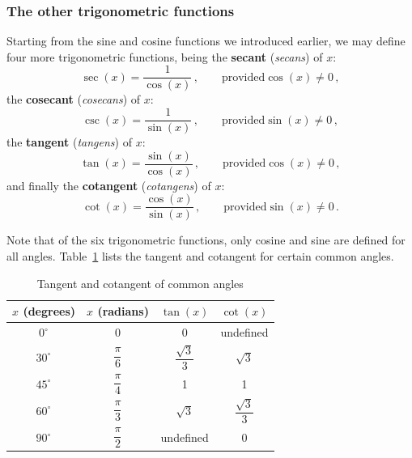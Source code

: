 \fi


\subsubsection{The other trigonometric functions}
Starting from the sine and cosine functions we introduced earlier,
we may define four more trigonometric functions, being the \textbf{secant} (\textit{secans}) of $x$:
$$\sec(x) = \dfrac{1}{\cos(x)}\,,\qquad \text{provided} \cos(x) \neq 0\,, $$
the \textbf{cosecant} (\textit{cosecans}) of $x$:
$$\csc(x) = \dfrac{1}{\sin(x)}\,,\qquad \text{provided}  \sin(x) \neq 0\,,$$
the \textbf{tangent} (\textit{tangens}) of $x$:
$$\tan(x) = \dfrac{\sin(x)}{\cos(x)}\,,\qquad \text{provided} \cos(x) \neq 0 \,,$$
  and finally  the \textbf{cotangent} (\textit{cotangens}) of $x$:
$$\cot(x) = \dfrac{\cos(x)}{\sin(x)}\,,\qquad \text{provided} \sin(x) \neq 0\,.$$


Note that of the six trigonometric functions, only cosine and sine are defined for all angles. Table~\ref{tab_trans_2} lists the tangent and cotangent for certain common angles. 

\begin{table}[H]
\caption{Tangent and cotangent of common angles}
\label{tab_trans_2}
\renewcommand{\arraystretch}{1.75}%
\begin{tabular}{cc|cc} 
 $x$ (degrees) &  $x$ (radians) & $\tan(x)$ & $\cot(x)$ \\ \hline\hline
$0^{\circ}$ & 0 & 0 & undefined \\ 
$30^{\circ}$ & $\dfrac{\pi}{6}$ & $\dfrac{\sqrt{3}}{3}$ & $\sqrt{3}$ \\ [2pt] 
$45^{\circ}$ & $\dfrac{\pi}{4}$ & 1 & 1\\ [2pt] 
$60^{\circ}$ & $\dfrac{\pi}{3}$ & $\sqrt{3}$& $\dfrac{\sqrt{3}}{3}$ \\ [2pt] 
$90^{\circ}$ & $\dfrac{\pi}{2}$ & undefined & 0 \\ [2pt] 
\end{tabular}
\renewcommand{\arraystretch}{1}%
\end{table}


